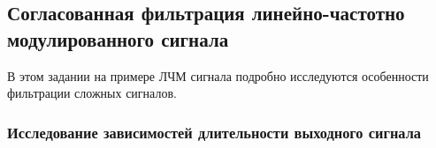 \subsection{Согласованная фильтрация линейно-частотно
модулированного сигнала}
В этом задании на примере ЛЧМ сигнала подробно исследуются
особенности фильтрации сложных сигналов. 




\subsubsection{Исследование зависимостей длительности выходного сигнала }%



